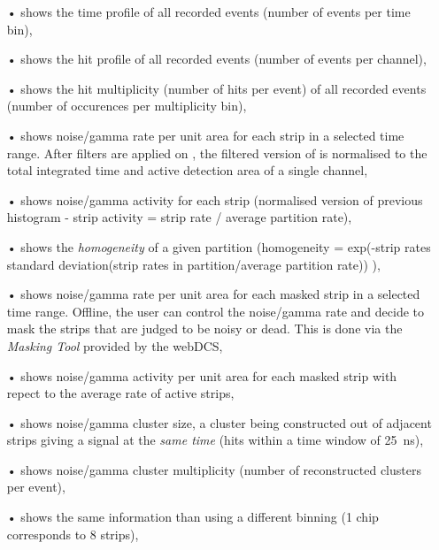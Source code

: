 	\begin{itemize}
		\item[•]  shows the time profile of all recorded events (number of events per time bin),
		\item[•]  shows the hit profile of all recorded events (number of events per channel),
		\item[•]  shows the hit multiplicity (number of hits per event) of all recorded events (number of occurences per multiplicity bin),
		\item[•]  shows noise/gamma rate per unit area for each strip in a selected time range. After filters are applied on , the filtered version of  is normalised to the total integrated time and active detection area of a single channel,
		\item[•]  shows noise/gamma activity for each strip (normalised version of previous histogram - strip activity = strip rate / average partition rate),
		\item[•]  shows the \textit{homogeneity} of a given partition (homogeneity = exp(-strip rates standard deviation(strip rates in partition/average partition rate)) ),
		\item[•]  shows noise/gamma rate per unit area for each masked strip in a selected time range. Offline, the user can control the noise/gamma rate and decide to mask the strips that are judged to be noisy or dead. This is done via the \textit{Masking Tool} provided by the webDCS,
		\item[•]  shows noise/gamma activity per unit area for each masked strip with repect to the average rate of active strips,
		\item[•]  shows noise/gamma cluster size, a cluster being constructed out of adjacent strips giving a signal at the \textit{same time} (hits within a time window of \SI{25}{ns}),
		\item[•]  shows noise/gamma cluster multiplicity (number of reconstructed clusters per event),
		\item[•]  shows the same information than  using a different binning (1 chip corresponds to 8 strips),

\end{itemize}
